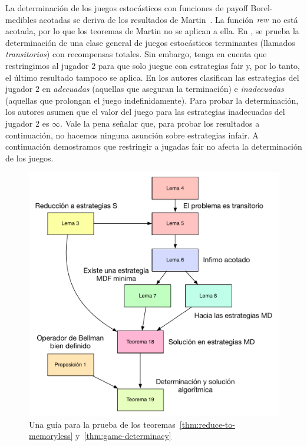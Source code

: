 La determinación de los juegos estocásticos con funciones de payoff Borel-medibles acotadas se deriva de los resultados de Martin~\cite{Martin98}. La función $\textit{rew}$ no está acotada, por lo que los teoremas de Martin no se aplican a ella. En \cite{FilarV96}, se prueba la determinación de una clase general de juegos estocásticos terminantes (llamados \emph{transitorios}) con recompensas totales. Sin embargo, tenga en cuenta que restringimos al jugador $2$ para que solo juegue con estrategias fair y, por lo tanto, el último resultado tampoco se aplica.
%
En \cite{PatekBertsekas99} los autores clasifican las estrategias del jugador $2$ en \emph{adecuadas} (aquellas que aseguran la terminación) e \emph{inadecuadas} (aquellas que prolongan el juego indefinidamente). Para probar la determinación, los autores asumen que el valor del juego para las estrategias inadecuadas del jugador $2$ es $\infty$. Vale la pena señalar que, para probar los resultados a continuación, no hacemos ninguna asunción sobre estrategias infair.
%
A continuación demostramos que restringir a jugadas fair no afecta la determinación de los juegos.
\begin{figure}
  \centering
  \includegraphics[scale=0.5]{Figs/roadmap.pdf}
  \caption{Una guía para la prueba de los teoremas~\ref{thm:reduce-to-memoryless} y~\ref{thm:game-determinacy}}\label{fig:roadmap}
\end{figure}


